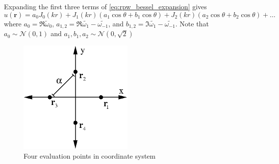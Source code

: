 \documentclass{report}
\newcommand{\rr}[0]{\mathbf{r}}
\begin{document}
Expanding the first three terms of \ref{eq:rpw_bessel_expansion} gives
\[
u(\rr) = a_{0} J_{0}(kr) + J_{1}(kr) (a_{1} \cos{\theta} + b_{1} \cos{\theta}) + J_{2}(kr) (a_{2} \cos{\theta} + b_{2} \cos{\theta}) + \ldots
\]
where $a_{0} = \Re \tilde{\omega}_{0}$, $a_{1,2} = \Re \tilde{\omega_{1}} - \tilde{\omega_{-1}}$, and $b_{1,2} = \Im \tilde{\omega_{1}} - \tilde{\omega_{-1}}$. Note that $a_{0} \sim \mathcal{N}(0,1)$ and $a_{1}, b_{1}, a_{2} \sim \mathcal{N}(0,\sqrt{2})$

\begin{figure}
  \begin{center}
    \includegraphics[width=0.5\textwidth]{figs/interpolation/four_points_on_axes.eps}
    \caption{Four evaluation points in coordinate system}
    \label{fig:four_points}
  \end{center}
\end{figure}
\end{document}
